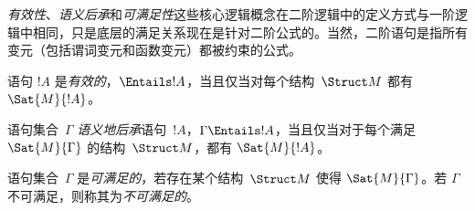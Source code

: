 \documentclass[../../../include/open-logic-section]{subfiles}
\begin{document}

\begin{explain}
\emph{有效性}、\emph{语义后承}和\emph{可满足性}这些核心逻辑概念在二阶逻辑中的定义方式与一阶逻辑中相同，只是底层的满足关系现在是针对二阶公式的。当然，二阶语句是指所有变元（包括谓词变元和函数变元）都被约束的公式。
\end{explain}

\begin{defn}[有效性]
语句 $!A$ 是\emph{有效的}，$\Entails !A$，当且仅当对每个结构~$\Struct M$ 都有 $\Sat{M}{!A}$。
\end{defn}

\begin{defn}[语义后承]
语句集合~$\Gamma$ \emph{语义地后承}语句~$!A$，$\Gamma \Entails !A$，当且仅当对于每个满足 $\Sat{M}{\Gamma}$ 的结构~$\Struct M$，都有 $\Sat{M}{!A}$。
\end{defn}

\begin{defn}[可满足性]
语句集合~$\Gamma$ 是\emph{可满足的}，若存在某个结构~$\Struct M$ 使得 $\Sat{M}{\Gamma}$。若 $\Gamma$ 不可满足，则称其为\emph{不可满足的}。
\end{defn}
\end{document}
